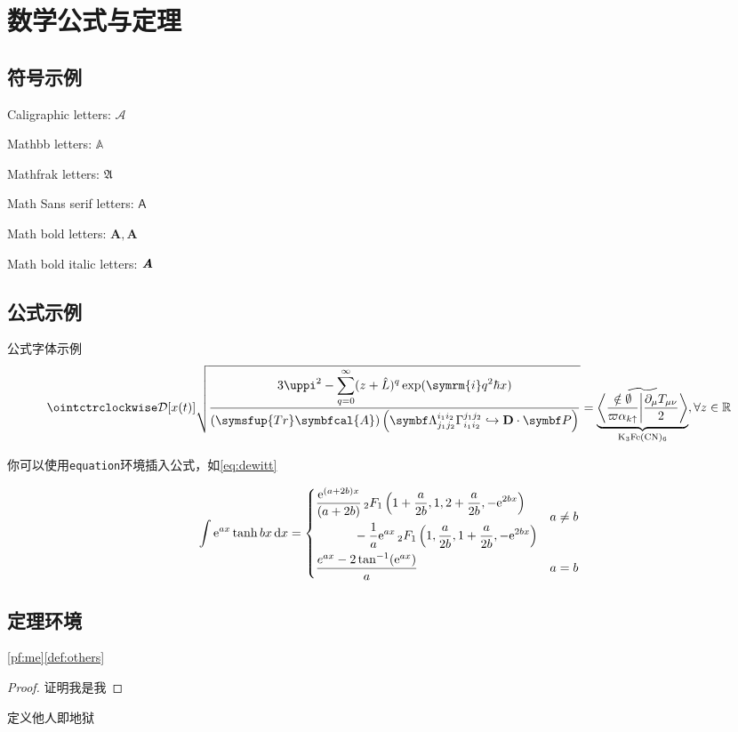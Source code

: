 \chapter{数学公式与定理}

\section{符号示例}

Caligraphic letters: $\mathcal{A}$

Mathbb letters: $\mathbb{A}$

Mathfrak letters: $\mathfrak{A}$

Math Sans serif letters: $\mathsf{A}$

Math bold letters: $\mathbf{A},\symbf{A}$

Math bold italic letters: $\textbf{\em A}$

\section{公式示例}

公式字体示例
\[
    \displaystyle \ointctrclockwise\mathcal{D}[x(t)]\sqrt{\frac{\displaystyle3\uppi^2-\sum_{q=0}^{\infty}(z+\hat L)^{q}\exp(\symrm{i}q^2 \hbar x)}{\displaystyle (\symsfup{Tr}\symbfcal{A})\left(\symbf\Lambda_{j_1j_2}^{i_1i_2}\Gamma_{i_1i_2}^{j_1j_2}\hookrightarrow\vec D\cdot \symbf P  \right)}}
    =\underbrace{\widetilde{\left\langle \frac{\notin \emptyset}{\varpi\alpha_{k\uparrow}}\middle\vert \frac{\partial_\mu T_{\mu\nu}}{2}\right\rangle}}_{\mathrm{K}_3\mathrm{Fe}(\mathrm{CN})_6} ,\forall z \in \mathbb{R}
\]

你可以使用\verb|equation|环境插入公式，如\cref{eq:dewitt}

\begin{equation}\label{eq:dewitt}
    \int \mathrm{e}^{ax} \tanh {bx} \, \mathrm{d}x =
    \begin{dcases}
        \begin{multlined}
            \frac{\mathrm{e}^{(a+2b)x}}{(a + 2b)} \,
            {{}_2F_1} \left( 1 + \frac{a}{2b}, 1, 2+\frac{a}{2b}, -\mathrm{e}^{2bx} \right) \\
            - \frac{1}{a} \mathrm{e}^{ax} \, {{}_2F_1} \left( 1, \frac{a}{2b}, 1 + \frac{a}{2b}, -\mathrm{e}^{2bx} \right)
        \end{multlined}
        & a \ne b \\
    \frac{e^{ax} - 2 \tan^{-1}(\mathrm{e}^{ax})}{a} & a = b
  \end{dcases}
\end{equation}

\section{定理环境}

\cref{pf:me}\cref{def:others}

\begin{proof}\label{pf:me}
    证明我是我
\end{proof}

\begin{definition}[他人]\label{def:others}
    定义他人即地狱
\end{definition}
